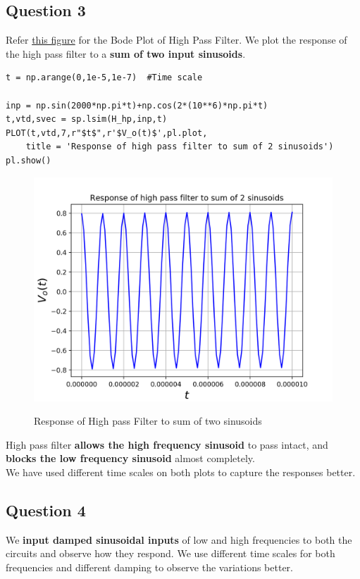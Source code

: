 \documentclass[11pt, a4paper]{article}
\begin{document}
\subsection{Question 3}
{
Refer \hyperlink{hpf}{this figure} for the Bode Plot of High Pass Filter.
We plot the response of the high pass filter to a \textbf{sum of two input sinusoids}.
}
\begin{verbatim}
t = np.arange(0,1e-5,1e-7)  #Time scale

inp = np.sin(2000*np.pi*t)+np.cos(2*(10**6)*np.pi*t)
t,vtd,svec = sp.lsim(H_hp,inp,t)
PLOT(t,vtd,7,r"$t$",r'$V_o(t)$',pl.plot,
	title = 'Response of high pass filter to sum of 2 sinusoids')
pl.show()

\end{verbatim}
\begin{figure}[H]
   	\centering
   	\includegraphics[scale=0.5]{hpf_2.png}
   	\label{fig:hpf_2}
   	\caption{Response of High pass Filter to sum of two sinusoids}
\end{figure}
{
High pass filter \textbf{allows the high frequency sinusoid} to pass intact, and \textbf{blocks the low frequency sinusoid} almost completely.
\\We have used different time scales on both plots to capture the responses better.
}

\subsection{Question 4}
{
We \textbf{input damped sinusoidal inputs} of low and high frequencies to both the circuits and observe how they respond. We use different time scales for both frequencies and different damping to observe the variations better.
}
\end{document}
